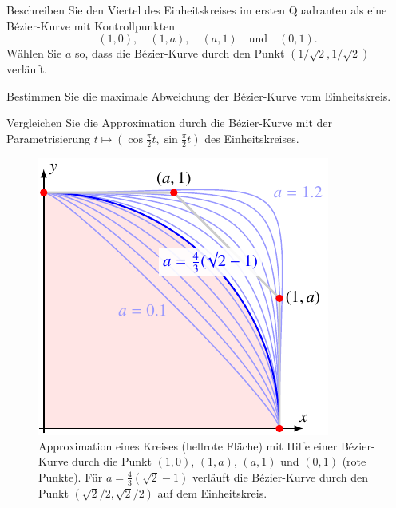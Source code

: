 Beschreiben Sie den Viertel des Einheitskreises im ersten Quadranten
als eine Bézier-Kurve mit Kontrollpunkten 
\[
(1,0),\quad (1,a), \quad (a,1) \quad\text{und}\quad (0,1).
\]
Wählen Sie $a$ so, dass die Bézier-Kurve durch den Punkt
$(1/\sqrt{2},1/\sqrt{2})$ verläuft.
\begin{teilaufgaben}
\item
Bestimmen Sie die maximale Abweichung der Bézier-Kurve vom Einheitskreis.
\item
Vergleichen Sie die Approximation durch die Bézier-Kurve mit
der Parametrisierung $t\mapsto (\cos\frac{\pi}2t,\sin\frac{\pi}2t)$ des
Einheitskreises.
\end{teilaufgaben}
\begin{figure}
\centering
\includegraphics{chapters/30-interpolation/uebungsaufgaben/3003kreis.pdf}
\caption{Approximation eines Kreises (hellrote Fläche) mit Hilfe einer
Bézier-Kurve durch die Punkt $(1,0)$, $(1,a)$, $(a,1)$ und $(0,1)$ (rote
Punkte).
Für $a=\frac43(\!\sqrt{2}-1)$ verläuft die Bézier-Kurve durch den 
Punkt $(\sqrt{2}/2,\sqrt{2}/2)$ auf dem Einheitskreis.
\label{3003:figure:kreis}}
\end{figure}

